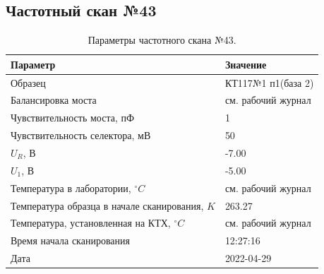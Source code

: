 \subsection{Частотный скан №43}
\begin{table}[!ht]
    \centering
    \caption{Параметры частотного скана №43.}
    \begin{tabular}{|l|l|}
        \hline
        Параметр                                       & Значение                  \\ \hline
        Образец                                        & КТ117№1 п1(база 2)        \\ \hline
        Балансировка моста                             & см. рабочий журнал        \\ \hline
        Чувствительность моста, пФ                     & 1                         \\ \hline
        Чувствительность селектора, мВ                 & 50                        \\ \hline
        $U_R$, В                                       & -7.00                     \\ \hline
        $U_1$, В                                       & -5.00                     \\ \hline
        Температура в лаборатории, $^\circ C$          & см. рабочий журнал        \\ \hline
        Температура образца в начале сканирования, $K$ & 263.27                    \\ \hline
        Температура, установленная на КТХ, $^\circ C$  & см. рабочий журнал        \\ \hline
        Время начала сканирования                      & 12:27:16                  \\ \hline
        Дата                                           & 2022-04-29                \\ \hline
    \end{tabular}
    \label{table:frequency_scan_43}
\end{table}

